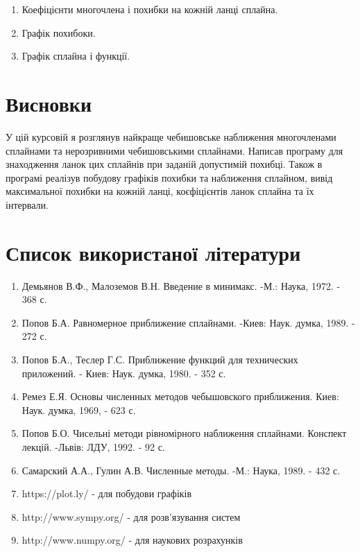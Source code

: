 \documentclass[ukrainian,14pt]{extarticle}
\begin{document}
\begin{enumerate}
\item Коефіцієнти многочлена і похибки на кожній ланці сплайна.
\item Графік похибоки.
\item Графік сплайна і функції.

\end{enumerate}
\newpage

\newpage

\section*{Висновки}
У цій курсовій я розглянув найкраще чебишовське наближення многочленами сплайнами та нерозривними чебишовськими сплайнами. Написав програму для знаходження ланок цих сплайнів при заданій допустимій похибці. Також в програмі реалізув побудову графіків похибки та наближення сплайном, вивід максимальної похибки на кожній ланці, коєфіцієнтів ланок сплайна та їх інтервали.

\newpage

\section*{Список використаної літератури}

\begin{enumerate}
\item  Демьянов В.Ф., Малоземов В.Н. Введение в минимакс. -М.: Наука, 1972. - 368 с.
\item Попов Б.А. Равномерное приближение сплайнами. -Киев: Наук. думка, 1989. - 272 с.
\item Попов Б.А., Теслер Г.С. Приближение функций для технических приложений. - Киев: Наук. думка, 1980. - 352 с.
\item Ремез Е.Я. Основы численных методов чебышовского приближения. Киев: Наук. думка, 1969, - 623 с.
\item Попов Б.О. Чисельні методи рівномірного наближення сплайнами. Конспект лекцій. -Львів: ЛДУ, 1992. - 92 с.
\item Самарский А.А., Гулин А.В. Численные методы. -М.: Наука, 1989. - 432 с.
\item https://plot.ly/ - для побудови графіків
\item http://www.sympy.org/ - для розв'язування систем
\item http://www.numpy.org/ - для наукових розрахунків
\end{enumerate}
\end{document}
